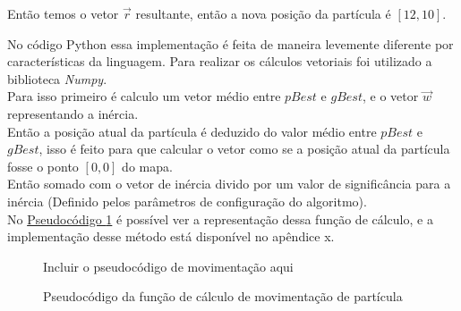 \noindent Então temos o vetor $\vec r$ resultante, então a nova posição da partícula é $[12,10]$.

No código Python essa implementação é feita de maneira levemente diferente por características da linguagem. Para realizar os cálculos vetoriais foi utilizado a biblioteca \textit{Numpy}.\\
\indent Para isso primeiro é calculo um vetor médio entre $pBest$ e $gBest$, e o vetor $\vec w$ representando a inércia.\\
\indent Então a posição atual da partícula é deduzido do valor médio entre $pBest$ e $gBest$, isso é feito para que calcular o vetor como se a posição atual da partícula fosse o ponto $[0,0]$ do mapa.\\
Então somado com o vetor de inércia divido por um valor de significância para a inércia (Definido pelos parâmetros de configuração do algoritmo).\\
\indent No \hyperref[cod:new-posicao]{Pseudocódigo \ref{cod:new-posicao}} é possível ver a representação dessa função de cálculo, e a implementação desse método está disponível no apêndice x.
\begin{figure}[ht]
\centering
\small{Incluir o pseudocódigo de movimentação aqui}
\caption{Pseudocódigo da função de cálculo de movimentação de partícula}
\label{cod:new-posicao}
\end{figure}

%


%

%


